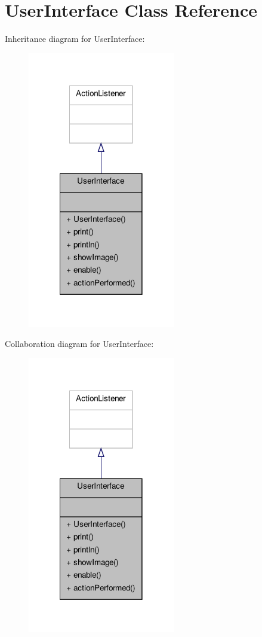 \hypertarget{classUserInterface}{\section{User\-Interface Class Reference}
\label{classUserInterface}
}


Inheritance diagram for User\-Interface\-:\nopagebreak
\begin{figure}[H]
\begin{center}
\leavevmode
\includegraphics[width=182pt]{classUserInterface__inherit__graph}
\end{center}
\end{figure}


Collaboration diagram for User\-Interface\-:\nopagebreak
\begin{figure}[H]
\begin{center}
\leavevmode
\includegraphics[width=182pt]{classUserInterface__coll__graph}
\end{center}
\end{figure}
